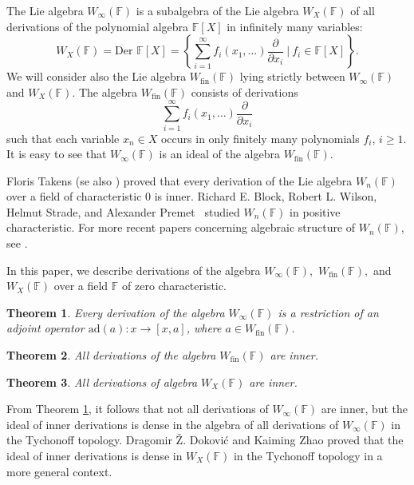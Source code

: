 \documentclass[12pt,a4paper]{amsart}
\theoremstyle{plain}
\newtheorem{Theorem}{Theorem}
\begin{document}
	The Lie algebra $W_\infty(\mathbb{F})$ is a subalgebra of the Lie algebra $W_X(\mathbb{F})$ of all derivations of the polynomial algebra $\mathbb{F}[X]$ in infinitely many variables:
	\[
	W_X(\mathbb{F}) = \text{Der } \mathbb{F}[X] = \left\{ \sum_{i=1}^{\infty} f_i(x_1, \ldots ) \frac{\partial}{\partial x_i} \ \Big| \ f_i \in \mathbb{F}[X] \right\}.
	\] We will consider also the Lie algebra $W_{\text{fin}}(\mathbb{F})$ lying strictly between $W_\infty(\mathbb{F})$ and $W_X(\mathbb{F})$. The algebra $W_{\text{fin}}(\mathbb{F})$ consists of derivations
	\[
	\sum_{i=1}^{\infty} f_i(x_1, \ldots ) \frac{\partial}{\partial x_i}
	\]
	such that each variable $x_n \in X$ occurs in only finitely many polynomials $f_i$, $i \geq 1$. It is easy to see that $W_\infty(\mathbb{F})$ is an ideal of the algebra $W_{\text{fin}}(\mathbb{F})$.
	
	
	Floris Takens \cite{Takens} (se also \cite{Farnsteiner,Morimoto}) proved that every derivation of the Lie algebra  $W_n(\mathbb{F})$ over a field of characteristic $0$ is inner. Richard E. Block, Robert L. Wilson, Helmut Strade, and Alexander Premet~\cite{Strade} studied $W_n(\mathbb{F})$ in positive characteristic. For more recent papers concerning algebraic structure of $W_n(\mathbb{F})$, see 	\cite{Bezushchak_Petravchuk_Zelmanov,Klymenko_Lysenko_Petravchuk,Makedonskyi_Petravchuk}.
	

	
	
	
	In this paper, we describe derivations of the algebra $W_\infty(\mathbb{F}),$ $W_{\text{fin}}(\mathbb{F}),$ and $ W_X(\mathbb{F}) $ over a field $\mathbb{F}$  of zero characteristic.
	
	\begin{Theorem}\label{Theo1} Every derivation of the algebra $W_\infty(\mathbb{F})$ is a restriction of an adjoint operator $\text{ad}(a):x\to [x,a]$, where $a \in W_{\text{fin}}(\mathbb{F})$. \end{Theorem}
	
	\begin{Theorem}\label{Theo2}  All derivations of the algebra $W_{\text{fin}}(\mathbb{F})$ are inner. \end{Theorem}
	
	
	\begin{Theorem}\label{Theo3} All  derivations of algebra $W_X(\mathbb{F})$ are inner. \end{Theorem}
	
	
	
	From Theorem \ref{Theo1}, it follows that not all derivations of $W_{\infty}(\mathbb{F})$ are inner, but the ideal of inner derivations is dense in the algebra of all derivations of $W_{\infty}(\mathbb{F})$ in the Tychonoff topology. Dragomir Ž. Doković and Kaiming Zhao  \cite{Doković_Zhao} proved that the ideal of inner derivations is dense in $W_X(\mathbb{F})$ in the Tychonoff topology in a more general context.
	
\end{document}
